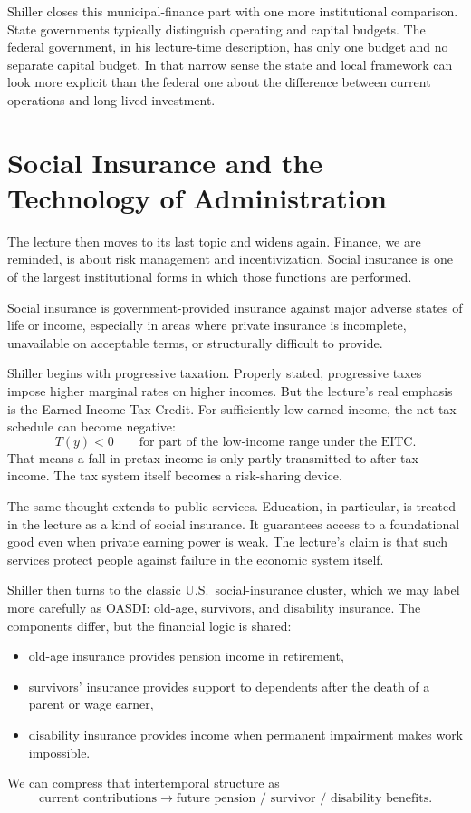 Shiller closes this municipal-finance part with one more institutional comparison. State governments typically distinguish operating and capital budgets. The federal government, in his lecture-time description, has only one budget and no separate capital budget. In that narrow sense the state and local framework can look more explicit than the federal one about the difference between current operations and long-lived investment.

\section{Social Insurance and the Technology of Administration}

The lecture then moves to its last topic and widens again. Finance, we are reminded, is about risk management and incentivization. Social insurance is one of the largest institutional forms in which those functions are performed.

\begin{definition}
Social insurance is government-provided insurance against major adverse states of life or income, especially in areas where private insurance is incomplete, unavailable on acceptable terms, or structurally difficult to provide.
\end{definition}

Shiller begins with progressive taxation. Properly stated, progressive taxes impose higher marginal rates on higher incomes. But the lecture's real emphasis is the Earned Income Tax Credit. For sufficiently low earned income, the net tax schedule can become negative:
\begin{equation}
T(y)<0
\qquad
\text{for part of the low-income range under the EITC.}
\end{equation}
That means a fall in pretax income is only partly transmitted to after-tax income. The tax system itself becomes a risk-sharing device.

The same thought extends to public services. Education, in particular, is treated in the lecture as a kind of social insurance. It guarantees access to a foundational good even when private earning power is weak. The lecture's claim is that such services protect people against failure in the economic system itself.

Shiller then turns to the classic U.S.\ social-insurance cluster, which we may label more carefully as OASDI: old-age, survivors, and disability insurance. The components differ, but the financial logic is shared:
\begin{itemize}
\item old-age insurance provides pension income in retirement,
\item survivors' insurance provides support to dependents after the death of a parent or wage earner,
\item disability insurance provides income when permanent impairment makes work impossible.
\end{itemize}
We can compress that intertemporal structure as
\begin{equation}
\text{current contributions} \longrightarrow \text{future pension / survivor / disability benefits}.
\end{equation}

